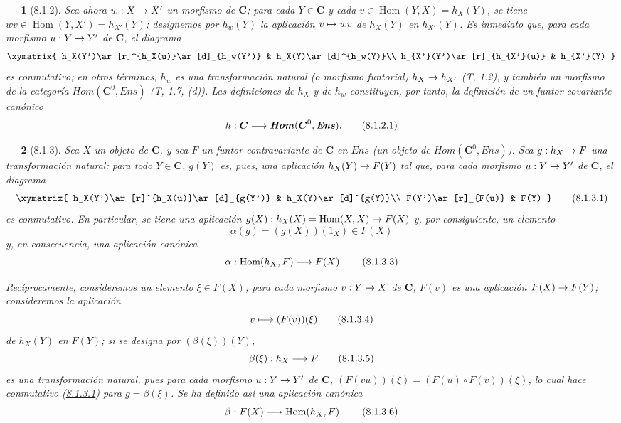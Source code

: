 \documentclass[10pt,oneside,openany]{book}
\makeatletter
\theoremstyle{egaenv}\newtheorem*{env}{---}
\theoremstyle{egastatement}
\theoremstyle{egadescription}
\newcommand{\oldpage}[2][]{\marginnote{\normalfont\scriptsize\textbf{#1}\,|\,#2}\ignorespaces}
\let\ega@shortmapsto\mapsto
\renewcommand{\to}{\mathchoice{\longrightarrow}{\rightarrow}{\rightarrow}{\rightarrow}}
\renewcommand{\mapsto}{\mathchoice{\longmapsto}{\ega@shortmapsto}{\ega@shortmapsto}{\ega@shortmapsto}}
\makeatother
\begin{document}
\begin{env}[8.1.2]
\label{0.8.1.2}
\label{0.8.1.2-fr}
Sea ahora $w:X\to X'$ un morfismo de $\boldsymbol{C}$; para cada $Y\in\boldsymbol{C}$ y cada $v\in\operatorname{Hom}(Y,X)=h_X(Y)$,
se tiene $wv\in\operatorname{Hom}(Y,X')=h_{X'}(Y)$; designemos por $h_w(Y)$ la aplicación $v\mapsto wv$ de
$h_X(Y)$ en $h_{X'}(Y)$. Es inmediato que, para cada morfismo $u:Y\to Y'$ de $\boldsymbol{C}$, el
diagrama
\[
  \xymatrix{
    h_X(Y')\ar[r]^{h_X(u)}\ar[d]_{h_w(Y')} &
    h_X(Y)\ar[d]^{h_w(Y)}\\
    h_{X'}(Y')\ar[r]_{h_{X'}(u)} &
    h_{X'}(Y)
  }
\]
es conmutativo; en otros términos, $h_w$ es una \emph{transformación natural (o morfismo funtorial)
$h_X\to h_{X'}$} (T, 1.2), y también un morfismo de la categoría $\boldsymbol{\mathit{Hom}}(\boldsymbol{C}^0,\boldsymbol{\mathit{Ens}})$ (T, 1.7, (\textit{d})). Las
definiciones de $h_X$ y de $h_w$ constituyen, por tanto, la definición de un \emph{funtor covariante
canónico}
\[
  h:\boldsymbol{C}\to\boldsymbol{\mathit{Hom}}(\boldsymbol{C}^0,\boldsymbol{\mathit{Ens}}).
  \tag{8.1.2.1}
\]
\end{env}

\begin{env}[8.1.3]
\label{0.8.1.3}
\label{0.8.1.3-fr}
Sea $X$ un objeto de $\boldsymbol{C}$, y sea $F$ un funtor contravariante de $\boldsymbol{C}$ en $\boldsymbol{\mathit{Ens}}$
(un objeto de $\boldsymbol{\mathit{Hom}}(\boldsymbol{C}^0,\boldsymbol{\mathit{Ens}})$). Sea $g:h_X\to F$ una \emph{transformación natural}: para todo $Y\in\boldsymbol{C}$,
\oldpage[0\textsubscript{III}]{6}
$g(Y)$ es, pues, una aplicación $h_X(Y)\to F(Y)$ tal que, para cada morfismo $u:Y\to Y'$ de $\boldsymbol{C}$,
el diagrama
\[
  \xymatrix{
    h_X(Y')\ar[r]^{h_X(u)}\ar[d]_{g(Y')} &
    h_X(Y)\ar[d]^{g(Y)}\\
    F(Y')\ar[r]_{F(u)} & F(Y)
  }
  \tag{8.1.3.1}\label{0.8.1.3.1-fr}
\]
es conmutativo. En particular, se tiene una aplicación $g(X):h_X(X)=\operatorname{Hom}(X,X)\to F(X)$ y, por consiguiente, un elemento
\[
  \alpha(g)=(g(X))(1_X)\in F(X)
  \tag{8.1.3.2}
\]
y, en consecuencia, una aplicación canónica
\[
  \alpha:\operatorname{Hom}(h_X,F)\to F(X).
  \tag{8.1.3.3}
\]

Recíprocamente, consideremos un elemento $\xi\in F(X)$; para cada morfismo $v:Y\to X$ de $\boldsymbol{C}$, $F(v)$ es una
aplicación $F(X)\to F(Y)$; consideremos la aplicación
\[
  v\mapsto(F(v))(\xi)
  \tag{8.1.3.4}
\]
de $h_X(Y)$ en $F(Y)$; si se designa por $(\beta(\xi))(Y)$,
\[
  \beta(\xi):h_X\to F
  \tag{8.1.3.5}
\]
es una \emph{transformación natural}, pues para cada morfismo $u:Y\to Y'$ de $\boldsymbol{C}$,
$(F(vu))(\xi)=(F(u)\circ F(v))(\xi)$, lo cual hace conmutativo (\hyperref[0.8.1.3.1]{8.1.3.1}) para $g=\beta(\xi)$.
Se ha definido así una aplicación canónica
\[
  \beta:F(X)\to\operatorname{Hom}(h_X,F).
  \tag{8.1.3.6}
\]
\end{env}
\end{document}
